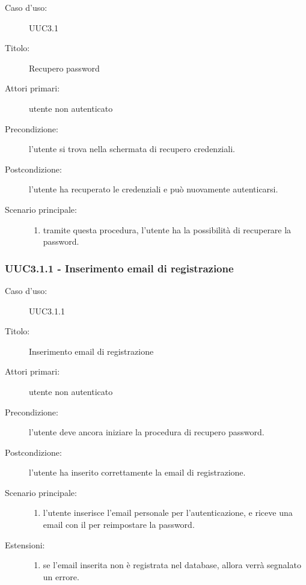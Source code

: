 \documentclass[casi-duso]{subfiles}
\begin{document}
\begin{description}
  \item[Caso d’uso:] UUC3.1
  \item[Titolo:] Recupero password
  \item[Attori primari:] utente non autenticato
  \item[Precondizione:] l'utente si trova nella schermata di recupero credenziali.
  \item[Postcondizione:] l'utente ha recuperato le credenziali e può nuovamente autenticarsi.
  \item[Scenario principale:]
        \begin{enumerate}
          \item tramite questa procedura, l'utente ha la possibilità di recuperare la password.
        \end{enumerate}
\end{description}

\subsubsection{UUC3.1.1 - Inserimento email di registrazione}%
\label{subsub:UUC3.1.1utente}
\begin{description}
  \item[Caso d’uso:] UUC3.1.1
  \item[Titolo:] Inserimento email di registrazione
  \item[Attori primari:] utente non autenticato
  \item[Precondizione:] l'utente deve ancora iniziare la procedura di recupero password.
  \item[Postcondizione:] l'utente ha inserito correttamente la email di registrazione.
  \item[Scenario principale:]
        \begin{enumerate}
          \item l'utente inserisce l'email personale per l'autenticazione, e riceve una email con il  per reimpostare la password.
        \end{enumerate}
  \item[Estensioni:]
        \begin{enumerate}
          \item se l'email inserita non è registrata nel database, allora verrà segnalato un errore.
        \end{enumerate}
\end{description}
\end{document}
